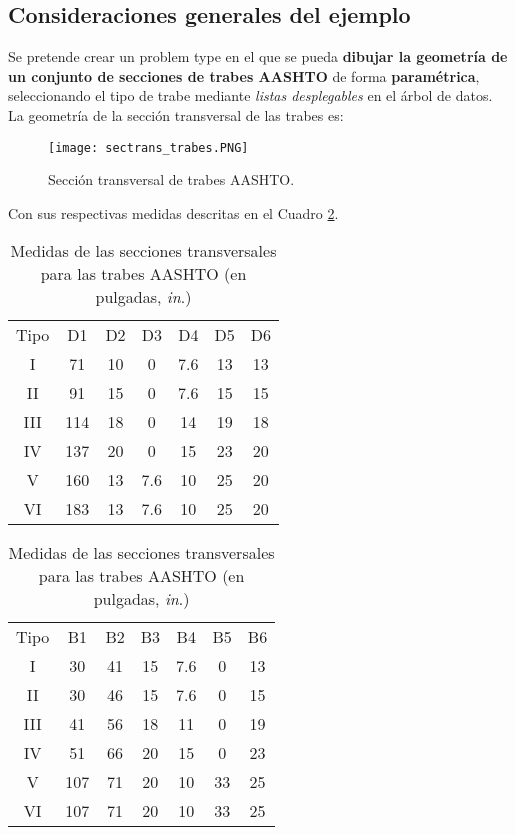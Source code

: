 \documentclass[10pt, a4paper, twocolumn]{article} %
\begin{document}
\subsection{Consideraciones generales del ejemplo} \label{sec:consideraciones}

Se pretende crear un problem type en el que se pueda \textbf{dibujar la geometría de un conjunto de secciones de trabes AASHTO} de forma \textbf{paramétrica}, seleccionando el tipo de trabe mediante \textit{listas desplegables} en el árbol de datos. La geometría de la sección transversal de las trabes es:

\begin{figure}[hbt!]\label{fig:sectrans_trabes}
	\centering
	\texttt{[image: sectrans\_trabes.PNG]}
	
	\caption{Sección transversal de trabes AASHTO.}
\end{figure}

Con sus respectivas medidas descritas en el Cuadro \ref{tab:medidasAASHTO}.

\begin{table}[hbtp!]\label{tab:medidasAASHTO}
\centering
	\begin{tabular}{*{7}{c}}
		\rowcolor{BlueGiD!60} Tipo&D1&D2&D3&D4&D5&D6\\
		\rowcolor{BlueGiD!20} I&71&10&0&7.6&13&13\\
		II&91&15&0&7.6&15&15\\
		\rowcolor{BlueGiD!20}III&114&18&0&14&19&18\\
		IV&137&20&0&15&23&20\\
		\rowcolor{BlueGiD!20}V&160&13&7.6&10&25&20\\
		VI&183&13&7.6&10&25&20\\
	\end{tabular}
	\vspace{0.2cm}
	\begin{tabular}{*{7}{c}}
		\rowcolor{BlueGiD!60} Tipo&B1&B2&B3&B4&B5&B6\\
		\rowcolor{BlueGiD!20} I&30&41&15&7.6&0&13\\
		II&30&46&15&7.6&0&15\\
		\rowcolor{BlueGiD!20}III&41&56&18&11&0&19\\
		IV&51&66&20&15&0&23\\
		\rowcolor{BlueGiD!20}V&107&71&20&10&33&25\\
		VI&107&71&20&10&33&25\\
	\end{tabular}
	\caption{Medidas de las secciones transversales para las trabes AASHTO (en pulgadas, \textit{in}.)}
\end{table}
\end{document}
